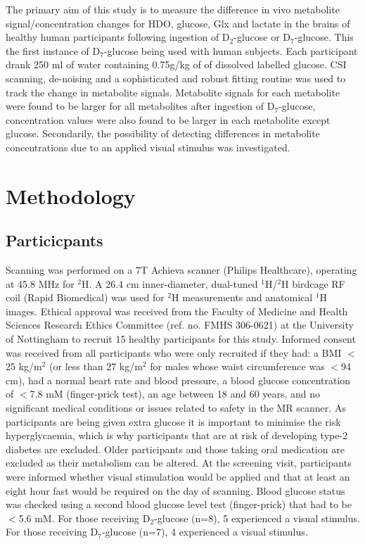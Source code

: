 The primary aim of this study is to measure the difference in vivo metabolite signal/concentration changes for \ac{HDO}, glucose, Glx and lactate in the brains of healthy human participants following ingestion of D$_2$-glucose or D$_7$-glucose. This the first instance of D$_7$-glucose being used with human subjects. Each participant drank 250 ml of water containing 0.75g/kg of of dissolved labelled glucose. \ac{CSI} scanning, de-noising and a sophisticated and robust fitting routine was used to track the change in metabolite signals. Metabolite signals for each metabolite were found to be larger for all metabolites after ingestion of D$_7$-glucose, concentration values were also found to be larger in each metabolite except glucose. Secondarily, the possibility of detecting differences in metabolite concentrations due to an applied visual stimulus was investigated.  

\section{Methodology}

\subsection{Particicpants}

Scanning was performed on a 7T Achieva scanner (Philips Healthcare), operating at 45.8 MHz for $^2$H. A 26.4 cm inner-diameter, dual-tuned $^1$H/$^2$H birdcage \ac{RF} coil (Rapid Biomedical) was used for $^2$H measurements and anatomical $^1$H images. Ethical approval was received from the Faculty of Medicine and Health Sciences Research Ethics Committee (ref. no. FMHS 306-0621) at the University of Nottingham to recruit 15 healthy participants for this study. Informed consent was received from all participants who were only recruited if they had: a \ac{BMI} $<$ 25 kg/m$^2$ (or less than 27 kg/m$^2$ for males whose waist circumference was $<$94 cm), had a normal heart rate and blood pressure, a blood glucose concentration of $<$7.8 mM (finger-prick test), an age between 18 and 60 years, and no significant medical conditions or issues related to safety in the MR scanner. As participants are being given extra glucose it is important to minimise the risk hyperglycaemia, which is why participants that are at risk of developing type-2 diabetes are excluded. Older participants and those taking oral medication are excluded as their metabolism can be altered. At the screening visit, participants were informed whether visual stimulation would be applied and that at least an eight hour fast would be required on the day of scanning. Blood glucose status was checked using a second blood glucose level test (finger-prick) that had to be $<$5.6 mM. For those receiving D$_2$-glucose (n=8), 5 experienced a visual stimulus. For those receiving D$_7$-glucose (n=7), 4 experienced a visual stimulus.

